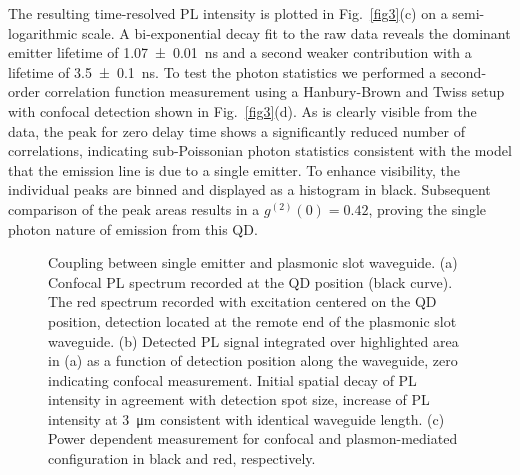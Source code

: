 \documentclass[journal=nalefd,manuscript=letter]{achemso}
\newcommand{\figurescale}{1}
\begin{document}
The resulting time-resolved PL intensity is plotted in Fig.~\ref{fig3}(c) on a semi-logarithmic scale.
A bi-exponential decay fit to the raw data reveals the dominant emitter lifetime of \SI{1.07 \pm 0.01}{\nano\second} and a second weaker contribution with a lifetime of \SI{3.5 \pm 0.1}{\nano\second}.
To test the photon statistics we performed a second-order correlation function measurement using a Hanbury-Brown and Twiss setup with confocal detection shown in Fig.~\ref{fig3}(d).
As is clearly visible from the data, the peak for zero delay time shows a significantly reduced number of correlations, indicating sub-Poissonian photon statistics consistent with the model that the emission line is due to a single emitter.
To enhance visibility, the individual peaks are binned and displayed as a histogram in black. Subsequent comparison of the peak areas results in a $g^{(2)}(0) = 0.42$, proving the single photon nature of emission from this QD.

\begin{figure}[!ht]
\scalebox{\figurescale}{\texttt{[image: fig4.pdf]}}
\renewcommand{\figurename}{Figure}
\caption{\label{fig4}
%
Coupling between single emitter and plasmonic slot waveguide.
(a) Confocal PL spectrum recorded at the QD position (black curve). The red spectrum recorded with excitation centered on the QD position, detection located at the remote end of the plasmonic slot waveguide.
(b) Detected PL signal integrated over highlighted area in (a) as a function of detection position along the waveguide, zero indicating confocal measurement. Initial spatial decay of PL intensity in agreement with detection spot size, increase of PL intensity at \SI{3}{\micro\meter} consistent with identical waveguide length.
(c) Power dependent measurement for confocal and plasmon-mediated configuration in black and red, respectively.
}
\end{figure}
\end{document}
